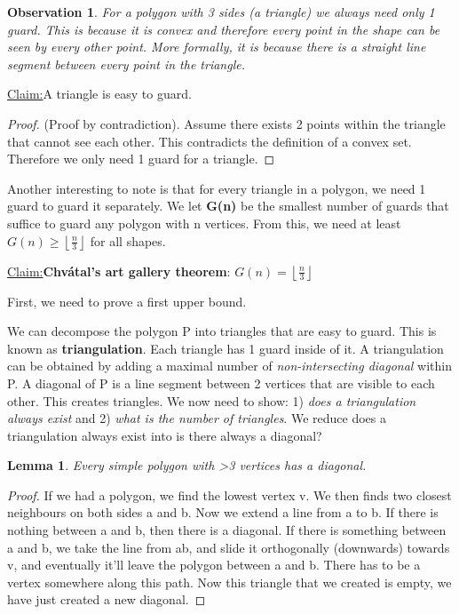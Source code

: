 \documentclass[11pt, oneside]{article}
\newtheorem{lemma}[theorem]{Lemma}
\newtheorem{observation}[theorem]{\textbf{Observation}}
\theoremstyle{definition}
\newenvironment{claim}[1]{\par\noindent\underline{Claim:}\space#1}{}
\begin{document}
\begin{observation}
  For a polygon with 3 sides (a triangle) we always need only 1 guard. This is because it is convex and therefore every point in the shape can be seen by every other point. More formally, it is because there is a straight line segment between every point in the triangle.
\end{observation}

\begin{claim}
  A triangle is easy to guard.
\end{claim}
\begin{proof}
  (Proof by contradiction). Assume there exists 2 points within the triangle that cannot see each other. This contradicts the definition of a convex set. Therefore we only need 1 guard for a triangle.
\end{proof}

Another interesting to note is that for every triangle in a polygon, we need 1 guard to guard it separately. We let \textbf{G(n)} be the smallest number of guards that suffice to guard any polygon with n vertices. From this, we need at least $G(n) \geq \left \lfloor{\frac{n}{3}}\right \rfloor$ for all shapes.

\begin{claim}
\textbf{Chvátal's art gallery theorem}: $G(n) = \left \lfloor{\frac{n}{3}}\right \rfloor$
\end{claim}

First, we need to prove a first upper bound.

We can decompose the polygon P into triangles that are easy to guard. This is known as \textbf{triangulation}. Each triangle has 1 guard inside of it. A triangulation can be obtained by adding a maximal number of \textit{non-intersecting diagonal} within P. A diagonal of P is a line segment between 2 vertices that are visible to each other. This creates triangles. We now need to show: 1) \textit{does a triangulation always exist} and 2) \textit{what is the number of triangles}. We reduce does a triangulation always exist into is there always a diagonal?

\begin{lemma}
  Every simple polygon with >3 vertices has a diagonal.
\end{lemma}
\begin{proof}
  If we had a polygon, we find the lowest vertex v. We then finds two closest neighbours on both sides a and b. Now we extend a line from a to b. If there is nothing between a and b, then there is a diagonal. If there is something between a and b, we take the line from ab, and slide it orthogonally (downwards) towards v, and eventually it'll leave the polygon between a and b. There has to be a vertex somewhere along this path. Now this triangle that we created is empty, we have just created a new diagonal.
\end{proof}
\end{document}
